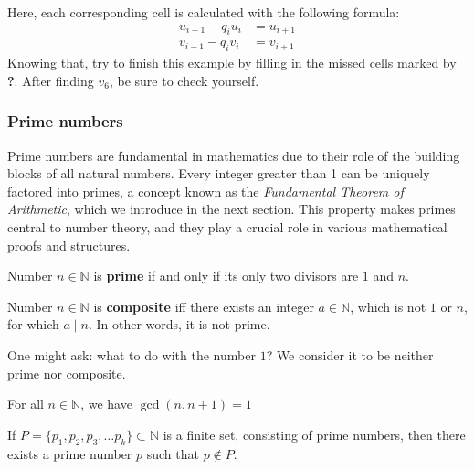 \documentclass[../lecture-notes.tex]{subfiles}
\begin{document}
\begin{example} 
\begin{minipage}{0.7\textwidth}
{\begin{tabular}{|c|c|c|c|c|c|c|c|}
                \hline
            \end{tabular}
        }
    \end{minipage}

    \hfill
    
    Here, each corresponding cell is calculated with the following formula: 
    \begin{align*}
        u_{i-1} - q_i u_i &= u_{i+1} \\
        v_{i-1} - q_i v_i &= v_{i+1} 
    \end{align*}
    Knowing that, try to finish this example by filling in the missed cells
    marked by \textcolor{green!60!black}{\textbf{?}}. After finding $v_6$, be
    sure to check yourself.
\end{example}

\subsubsection{Prime numbers}

Prime numbers are fundamental in mathematics due to their role of the building
blocks of all natural numbers. Every integer greater than 1 can be uniquely
factored into primes, a concept known as the \emph{Fundamental Theorem of
Arithmetic}, which we introduce in the next section. This property makes primes
central to number theory, and they play a crucial role in various mathematical
proofs and structures.

\begin{definition}
    Number $n \in \mathbb{N}$ is \textbf{prime} if and only if its only two divisors are $1$
    and $n$. 
\end{definition}

\begin{definition}
    Number $n \in \mathbb{N}$ is \textbf{composite} iff there exists an integer
    $a \in \mathbb{N}$, which is not $1$ or $n$, for which $a \mid n$. In other words,
    it is not prime.
\end{definition}

\begin{remark}
    One might ask: what to do with the number $1$? We consider it to
    be neither prime nor composite.
\end{remark}

\begin{lemma}
    For all $n \in \mathbb{N}$, we have $\gcd(n, n+1) = 1$
\end{lemma}

\begin{theorem} 
    If $P = \{p_1, p_2, p_3, \dots p_k\} \subset \mathbb{N}$ is a finite set,
    consisting of prime numbers, then there exists a prime number $p$ such that
    $p \notin P$.
\end{theorem}
\end{document}
